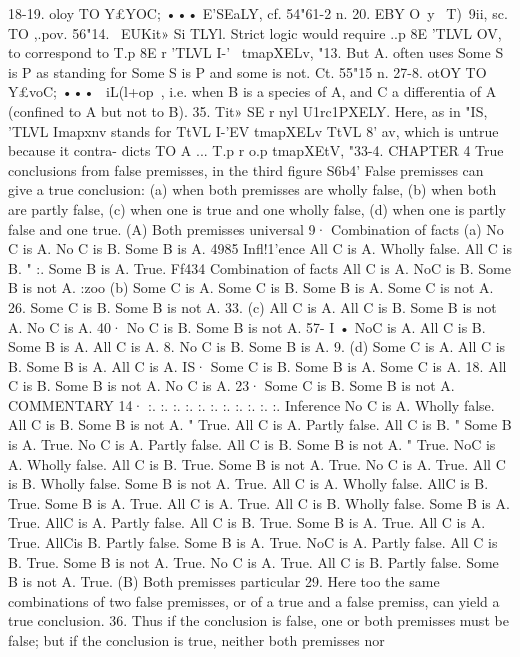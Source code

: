 18-19. oloy TO Y£YOC; ••• E'{SEaLY, cf. 54"61-2 n.
20. EBY O~y ~T)~9ii, sc. TO ,.pov.
56"14. ~EUKit» Si TLYl. Strict logic would require .\WK.p 8E 'TLVL OV,
to correspond to T.p 8E r 'TLVL I-'~ tmapXELv, "13. But A. often uses
Some S is P as standing for Some S is P and some is not. Ct.
55"15 n.
27-8. otOY TO Y£voC; ••• ~iL(l+op~, i.e. when B is a species of A,
and C a differentia of A (confined to A but not to B).
35. Tit» SE r nyl U1rc1PXELY. Here, as in "IS, 'TLVL Imapxnv stands
for TtVL I-'EV tmapXELv TtVL 8' av, which is untrue because it contra-
dicts TO A ... T.p r o.\<p tmapXEtV, "33-4.
CHAPTER 4
True conclusions from false premisses, in the third figure
S6b4' False premisses can give a true conclusion: (a) when both
premisses are wholly false, (b) when both are partly false, (c) when
one is true and one wholly false, (d) when one is partly false and
one true.
(A) Both premisses universal
9·
Combination of facts
(a) No C is A.
No C is B.
Some B is A.
4985
Infl!1'ence
All C is A. Wholly false.
All C is B.
"
:. Some B is A. True.
Ff434
Combination of facts
All C is A.
NoC is B.
Some B is not A.
:zoo (b) Some C is A.
Some C is B.
Some B is A.
Some C is not A.
26.
Some C is B.
Some B is not A.
33. (c) All C is A.
All C is B.
Some B is not A.
No C is A.
40·
No C is B.
Some B is not A.
57- I • NoC is A.
All C is B.
Some B is A.
All C is A.
8.
No C is B.
Some B is A.
9. (d) Some C is A.
All C is B.
Some B is A.
All C is A.
IS·
Some C is B.
Some B is A.
Some C is A.
18.
All C is B.
Some B is not A.
No C is A.
23·
Some C is B.
Some B is not A.
COMMENTARY
14·
:.
:.
:.
:.
:.
:.
:.
:.
:.
:.
:.
Inference
No C is A. Wholly false.
All C is B.
Some B is not A. " True.
All C is A. Partly false.
All C is B.
"
Some B is A. True.
No C is A. Partly false.
All C is B.
Some B is not A. " True.
NoC is A. Wholly false.
All C is B. True.
Some B is not A. True.
No C is A. True.
All C is B. Wholly false.
Some B is not A. True.
All C is A. Wholly false.
AllC is B. True.
Some B is A. True.
All C is A. True.
All C is B. Wholly false.
Some B is A. True.
AllC is A. Partly false.
All C is B. True.
Some B is A. True.
All C is A. True.
AllCis B. Partly false.
Some B is A. True.
NoC is A. Partly false.
All C is B. True.
Some B is not A. True.
No C is A. True.
All C is B. Partly false.
Some B is not A. True.
(B) Both premisses particular
29. Here too the same combinations of two false premisses, or
of a true and a false premiss, can yield a true conclusion.
36. Thus if the conclusion is false, one or both premisses must
be false; but if the conclusion is true, neither both premisses nor
}
